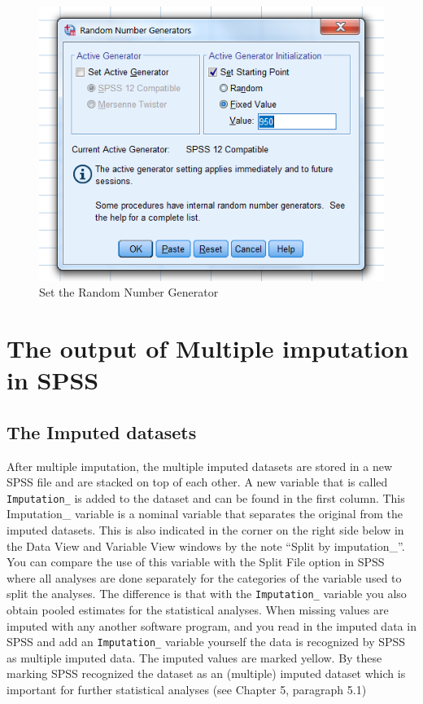 \documentclass[
]{book}
\begin{document}
\begin{figure}

{\centering \includegraphics[width=0.7\linewidth]{images/fig4.5} 

}

\caption{Set the Random Number Generator }\label{fig:fig4-5}
\end{figure}

\hypertarget{the-output-of-multiple-imputation-in-spss}{%
\section{The output of Multiple imputation in
SPSS}\label{the-output-of-multiple-imputation-in-spss}}

\hypertarget{the-imputed-datasets}{%
\subsection{The Imputed datasets}\label{the-imputed-datasets}}

After multiple imputation, the multiple imputed datasets are stored in a
new SPSS file and are stacked on top of each other. A new variable that
is called \texttt{Imputation\_} is added to the dataset and can be found
in the first column. This Imputation\_ variable is a nominal variable
that separates the original from the imputed datasets. This is also
indicated in the corner on the right side below in the Data View and
Variable View windows by the note ``Split by imputation\_''. You can
compare the use of this variable with the Split File option in SPSS
where all analyses are done separately for the categories of the
variable used to split the analyses. The difference is that with the
\texttt{Imputation\_} variable you also obtain pooled estimates for the
statistical analyses. When missing values are imputed with any another
software program, and you read in the imputed data in SPSS and add an
\texttt{Imputation\_} variable yourself the data is recognized by SPSS
as multiple imputed data. The imputed values are marked yellow. By these
marking SPSS recognized the dataset as an (multiple) imputed dataset
which is important for further statistical analyses (see Chapter 5,
paragraph 5.1)
\end{document}
